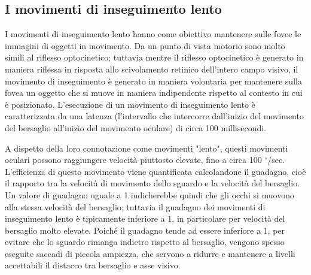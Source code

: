 \documentclass[12pt]{article}
\begin{document}
\subsection{I movimenti di inseguimento lento}
I movimenti di inseguimento lento hanno come obiettivo mantenere sulle fovee le immagini di oggetti in movimento. Da un punto di vista motorio sono molto simili al riflesso optocinetico; tuttavia mentre il riflesso optocinetico è generato in maniera riflessa in risposta allo scivolamento retinico dell'intero campo visivo, il movimento di inseguimento è generato in maniera volontaria per mantenere sulla fovea un oggetto che si muove in maniera indipendente rispetto al contesto in cui è posizionato. L'esecuzione di un movimento di inseguimento lento è caratterizzata da una latenza (l'intervallo che intercorre dall'inizio del movimento del bersaglio all'inizio del movimento oculare) di circa 100 millisecondi. 

A dispetto della loro connotazione come movimenti "lento", questi movimenti oculari possono raggiungere velocità piuttosto elevate, fino a circa 100 $^{\circ}$/sec. L'efficienza di questo movimento viene quantificata calcolandone il guadagno, cioè il rapporto tra la velocità di movimento dello sguardo e la velocità del bersaglio. Un valore di guadagno uguale a 1 indicherebbe quindi che gli occhi si muovono alla stessa velocità del bersaglio; tuttavia il guadagno dei movimenti di inseguimento lento è tipicamente inferiore a 1, in particolare per velocità del bersaglio molto elevate. Poiché il guadagno tende ad essere inferiore a 1, per evitare che lo sguardo rimanga indietro rispetto al bersaglio, vengono spesso eseguite saccadi di piccola ampiezza, che servono a ridurre e mantenere a livelli accettabili il distacco tra bersaglio e asse visivo.
\end{document}
